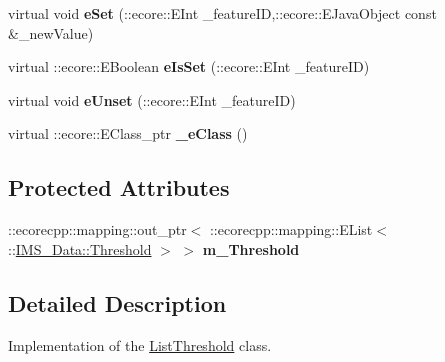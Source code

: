 \begin{DoxyCompactItemize}
\item 
\hypertarget{classIMS__Data_1_1ListThreshold_a6f94d2a819a350e0592706ce18b4b3ad}{
virtual void {\bfseries eSet} (::ecore::EInt \_\-featureID,::ecore::EJavaObject const \&\_\-newValue)}
\label{classIMS__Data_1_1ListThreshold_a6f94d2a819a350e0592706ce18b4b3ad}

\item 
\hypertarget{classIMS__Data_1_1ListThreshold_abcc96ec4a76258eef06ab91bbf078e40}{
virtual ::ecore::EBoolean {\bfseries eIsSet} (::ecore::EInt \_\-featureID)}
\label{classIMS__Data_1_1ListThreshold_abcc96ec4a76258eef06ab91bbf078e40}

\item 
\hypertarget{classIMS__Data_1_1ListThreshold_a74747b834e05acf8a78bd994f09ecfe2}{
virtual void {\bfseries eUnset} (::ecore::EInt \_\-featureID)}
\label{classIMS__Data_1_1ListThreshold_a74747b834e05acf8a78bd994f09ecfe2}

\item 
\hypertarget{classIMS__Data_1_1ListThreshold_a9a0feefdcdd24febb73eacf35f63bf3b}{
virtual ::ecore::EClass\_\-ptr {\bfseries \_\-eClass} ()}
\label{classIMS__Data_1_1ListThreshold_a9a0feefdcdd24febb73eacf35f63bf3b}

\end{DoxyCompactItemize}
\subsection*{Protected Attributes}
\begin{DoxyCompactItemize}
\item 
\hypertarget{classIMS__Data_1_1ListThreshold_afca160bb17cf7fee733af854e1ed14d6}{
::ecorecpp::mapping::out\_\-ptr$<$ ::ecorecpp::mapping::EList$<$ ::\hyperlink{classIMS__Data_1_1Threshold}{IMS\_\-Data::Threshold} $>$ $>$ {\bfseries m\_\-Threshold}}
\label{classIMS__Data_1_1ListThreshold_afca160bb17cf7fee733af854e1ed14d6}

\end{DoxyCompactItemize}


\subsection{Detailed Description}
Implementation of the \hyperlink{classIMS__Data_1_1ListThreshold}{ListThreshold} class. 

